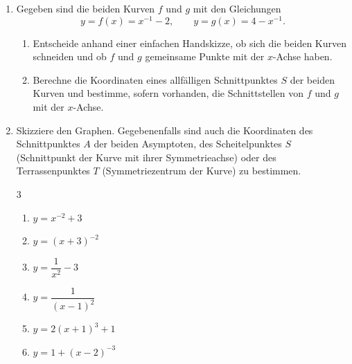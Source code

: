 \begin{enumerate}
          \begin{multicols}{2}
              \begin{enumerate}[label=\alph*)]
                  \item $y=(x-2)^2$
                  \item $y=(x+2)^2$
                  \item $y=x^2-4$
                  \item $y=4-x^2$
                  \item $y=(x-2)^{-1}$
                  \item $y=x^{-1}-2$
                  \item $y=x^{-2}+1$
                  \item $y=(2-x)^{-1}$
              \end{enumerate}
          \end{multicols}


    \item
          Gegeben sind die beiden Kurven $f$ und $g$ mit den Gleichungen
          \[
              y=f(x)=x^{-1}-2,
              \qquad
              y=g(x)=4-x^{-1}.
          \]

          \begin{enumerate}[label=\alph*)]
              \item Entscheide anhand einer einfachen Handskizze, ob sich die beiden Kurven schneiden
                    und ob $f$ und $g$ gemeinsame Punkte mit der $x$-Achse haben.

              \item Berechne die Koordinaten eines allfälligen Schnittpunktes $S$ der beiden Kurven
                    und bestimme, sofern vorhanden, die Schnittstellen von $f$ und $g$ mit der $x$-Achse.
          \end{enumerate}


    \item
          Skizziere den Graphen. Gegebenenfalls sind auch die Koordinaten des Schnittpunktes $A$
          der beiden Asymptoten, des Scheitelpunktes $S$ (Schnittpunkt der Kurve mit ihrer
          Symmetrieachse) oder des Terrassenpunktes $T$ (Symmetriezentrum der Kurve) zu bestimmen.

          \begin{multicols}{3}
              \begin{enumerate}[label=\alph*)]
                  \item $y=x^{-2}+3$
                  \item $y=(x+3)^{-2}$
                  \item $y=\dfrac{1}{x^2}-3$
                  \item $y=\dfrac{1}{(x-1)^2}$
                  \item $y=2(x+1)^3+1$
                  \item $y=1+(x-2)^{-3}$
              \end{enumerate}
          \end{multicols}

\end{enumerate}
\newpage
